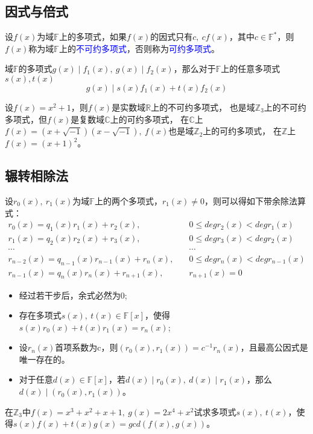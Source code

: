 \documentclass[cn,10pt]{elegantbook}
\begin{document}
\subsection{因式与倍式}
\begin{definition}
  设$f(x)$为域$\mathbb{F}$上的多项式，如果$f(x)$的因式只有$c,\ cf(x)$，其中$c \in \mathbb{F}^{*}$，则$f(x)$称为域$\mathbb{F}$上的\textcolor{blue}{不可约多项式}，否则称为\textcolor{blue}{可约多项式}。
\end{definition}
\begin{theorem}
  域$\mathbb{F}$的多项式$g(x)\mid f_1(x),\ g(x) \mid f_2(x)$，那么对于$\mathbb{F}$上的任意多项式$s(x),t(x)$
  \begin{equation*}
    g(x) \mid s(x)f_1(x)+t(x)f_2(x)
  \end{equation*}
\end{theorem}
\begin{example}
  设$f(x)=x^2+1$，则$f(x)$是实数域$\mathbb{R}$上的不可约多项式，
  也是域$\mathbb{Z}_3$上的不可约多项式，但$f(x)$是复数域$\mathbb{C}$上的可约多项式，
  在$\mathbb{C}$上$f(x)=(x+\sqrt{-1})(x-\sqrt{-1}),\ f(x)$也是域$\mathbb{Z}_2$上的可约多项式，
  在$\mathbb{Z}$上$f(x)=(x+1)^2$。
\end{example}
\subsection{辗转相除法}
\begin{theorem}
  设$r_0(x),\ r_1(x)$为域$\mathbb{F}$上的两个多项式，$r_1(x) \neq 0$，则可以得如下带余除法算式：
  \begin{align*}
    r_0(x) = q_1(x)r_1(x)+r_2(x),&\quad 0 \leq degr_2(x) < degr_1(x)\\
    r_1(x) = q_2(x)r_2(x)+r_3(x),&\quad 0 \leq degr_3(x) < degr_2(x)\\
    \cdots & \quad \cdots\\
    r_{n-2}(x)=q_{n-1}(x)r_{n-1}(x)+r_n(x),&\quad 0 \leq degr_n(x)<degr_{n-1}(x)\\
    r_{n-1}(x)=q_n(x)r_n(x)+r_{n+1}(x),& \quad r_{n+1}(x) = 0
  \end{align*}
  \begin{itemize}
    \item 经过若干步后，余式必然为0;
    \item 存在多项式$s(x),\ t(x) \in \mathbb{F}[x]$，使得$s(x)r_0(x)+t(x)r_1(x)=r_n(x)$;
    \item 设$r_n(x)$首项系数为c，则$(r_0(x),r_1(x))= c^{-1}r_n(x)$，且最高公因式是唯一存在的。
    \item 对于任意$d(x) \in \mathbb{F}[x]$，若$d(x) \mid r_0(x),\ d(x)\mid r_1(x)$，那么$d(x)\mid (r_0(x),r_1(x))$。
  \end{itemize}
\end{theorem}
\begin{exercise}
  在$\mathbb{Z}_3$中$f(x)=x^3+x^2+x+1,\ g(x)=2x^4+x^2$试求多项式$s(x),\ t(x)$，使得$s(x)f(x)+t(x)g(x)= gcd(f(x),g(x))$。
\end{exercise}
\end{document}
